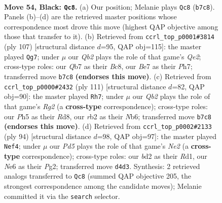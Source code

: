 \documentclass[11pt]{article}
\begin{document}
\clearpage

\begin{figure}[p]\centering
\begin{subfigure}{0.46\textwidth}\centering
\resizebox{\linewidth}{!}{%
\newchessgame
\chessboard[
  setfen={nr4k1/1q2br2/p3n3/P1p2p1p/1P1p1Pp1/6P1/QRNBP2P/2RN2K1 b - - 0 54},
  showmover=false,
  pgfstyle=straightmove, color=movearrow, markmove={b7-c8}
]}
\caption{}
\end{subfigure}\hfill
\begin{subfigure}{0.46\textwidth}\centering
\resizebox{\linewidth}{!}{%
\newchessgame
\chessboard[
  setfen={2b1rr1k/4q2p/1p1p1pp1/2n2P1n/p1PNP1N1/P5PP/1P1QR1BK/4R3 b - - 8 54},
  showmover=false,
  pgfstyle=straightmove, color=movearrow, markmove={e7-g7}
]}
\caption{}
\end{subfigure}
\\[4pt]
\begin{subfigure}{0.46\textwidth}\centering
\resizebox{\linewidth}{!}{%
\newchessgame
\chessboard[
  setfen={3r3k/b4pr1/1nq3p1/4pPPp/1Pp1P2P/p1Pp1QN1/P2B2RK/4R3 b - - 49 56},
  showmover=false,
  pgfstyle=straightmove, color=movearrow, markmove={g7-h7}
]}
\caption{}
\end{subfigure}\hfill
\begin{subfigure}{0.46\textwidth}\centering
\resizebox{\linewidth}{!}{%
\newchessgame
\chessboard[
  setfen={1r6/1r2q1bk/p2pp1pp/2p1np2/1PP5/P2NPP1P/Q3N1P1/1R1R2K1 w - - 0 48},
  showmover=false,
  pgfstyle=straightmove, color=movearrow, markmove={e2-f4}
]}
\caption{}
\end{subfigure}
\caption{\textbf{Move 54, Black: \texttt{Qc8}.} (a) Our position; Melanie plays \texttt{Qc8} (\texttt{b7c8}). Panels (b)--(d) are the retrieved master positions whose correspondence most drove this move (highest QAP objective among those that transfer to it). (b) Retrieved from \texttt{ccrl\_top\_p0001\#3814} (ply 107) [structural distance $d$=95, QAP obj=115]: the master played \texttt{Qg7}; under $\mu$ our \emph{Qb2} plays the role of that game's \emph{Qe2}; cross-type roles: our \emph{Q}b7 as their \emph{B}c8, our \emph{B}e7 as their \emph{P}h7; transferred move \texttt{b7c8} \textbf{(endorses this move)}. (c) Retrieved from \texttt{ccrl\_top\_p0000\#2432} (ply 111) [structural distance $d$=82, QAP obj=90]: the master played \texttt{Rh7}; under $\mu$ our \emph{Qb2} plays the role of that game's \emph{Rg2} (a \textbf{cross-type} correspondence); cross-type roles: our \emph{P}h5 as their \emph{R}d8, our \emph{r}b2 as their \emph{N}b6; transferred move \texttt{b7c8} \textbf{(endorses this move)}. (d) Retrieved from \texttt{ccrl\_top\_p0002\#2133} (ply 94) [structural distance $d$=98, QAP obj=97]: the master played \texttt{Nef4}; under $\mu$ our \emph{Pd5} plays the role of that game's \emph{Ne2} (a \textbf{cross-type} correspondence); cross-type roles: our \emph{b}d2 as their \emph{R}d1, our \emph{N}e6 as their \emph{P}g2; transferred move \texttt{d4d3}. Synthesis: 2 retrieved analogs transferred to \texttt{Qc8} (summed QAP objective 205, the strongest correspondence among the candidate moves); Melanie committed it via the \texttt{search} selector.}
\label{fig:thought-m107}
\end{figure}
\end{document}

